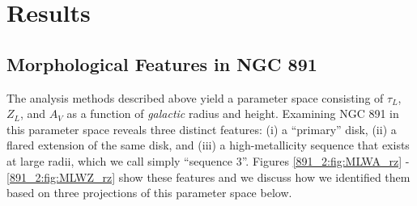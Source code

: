 \section{Results}
\label{891_2:sec:results}

\subsection{Morphological Features in NGC 891}
\label{891_2:sec:rz}

The analysis methods described above yield a parameter space
consisting of $\tau_L$, $Z_L$, and $A_V$ as a function of
\emph{galactic} radius and height. Examining NGC 891 in this parameter
space reveals three distinct features: (i) a ``primary'' disk, (ii) a
flared extension of the same disk, and (iii) a high-metallicity
sequence that exists at large radii, which we call simply ``sequence
3''. Figures \ref{891_2:fig:MLWA_rz} - \ref{891_2:fig:MLWZ_rz} show these
features and we discuss how we identified them based on three
projections of this parameter space below.







